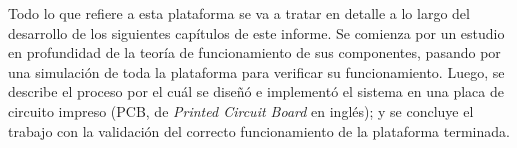 Todo lo que refiere a esta plataforma se va a tratar en detalle a lo largo del desarrollo de los siguientes capítulos de este informe. Se comienza por un estudio en profundidad de la teoría de funcionamiento de sus componentes, pasando por una simulación de toda la plataforma para verificar su funcionamiento. Luego, se describe el proceso por el cuál se diseñó e implementó el sistema en una placa de circuito impreso (PCB, de \textit{Printed Circuit Board} en inglés); y se concluye el trabajo con la validación del correcto funcionamiento de la plataforma terminada.\\

